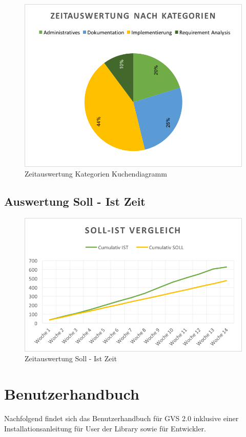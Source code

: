 \documentclass[11pt,a4paper,english,oneside]{book}
\numberwithin{equation}{chapter}
\begin{document}
	\clearpage

	\begin{figure}[h!]
		\centering
		\includegraphics[width=0.7\linewidth]{assets/images/zeitauswertung-kat-pie}
		\caption{Zeitauswertung Kategorien Kuchendiagramm}
		\label{zeitauswertung-kategorien-pie}
	\end{figure}


	\section{Auswertung Soll - Ist Zeit}
	\begin{figure}[h!]
		\centering
		\includegraphics[width=0.7\linewidth]{assets/images/zeitauswertung-soll_ist}
		\caption{Zeitauswertung Soll - Ist Zeit}
		\label{zeitauswertung-soll_ist}
	\end{figure}
	
	\chapter{Benutzerhandbuch} \label{ch:manual}
	Nachfolgend findet sich das Benutzerhandbuch für GVS 2.0 inklusive einer Installationsanleitung für User der Library sowie für Entwickler.
	
		
	
\end{document}
